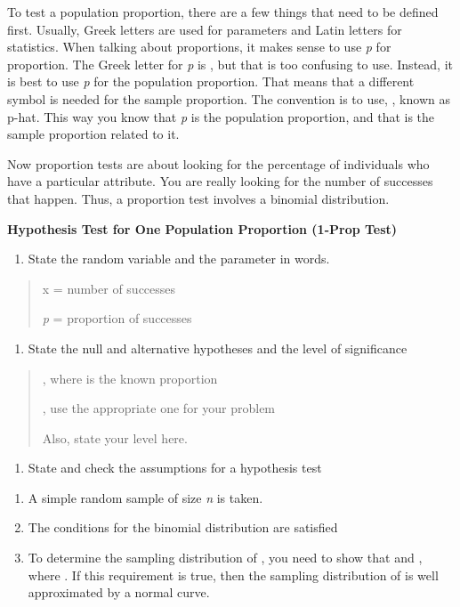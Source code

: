 \documentclass[]{book}
\providecommand{\tightlist}{%
  \setlength{\itemsep}{0pt}\setlength{\parskip}{0pt}}
\begin{document}
To test a population proportion, there are a few things that need to be defined first. Usually, Greek letters are used for parameters and Latin letters for statistics. When talking about proportions, it makes sense to use \emph{p} for proportion. The Greek letter for \emph{p} is , but that is too confusing to use. Instead, it is best to use \emph{p} for the population proportion. That means that a different symbol is needed for the sample proportion. The convention is to use, , known as p-hat. This way you know that \emph{p} is the population proportion, and that is the sample proportion related to it.

Now proportion tests are about looking for the percentage of individuals who have a particular attribute. You are really looking for the number of successes that happen. Thus, a proportion test involves a binomial distribution.

\textbf{Hypothesis Test for One Population Proportion (1-Prop Test)}

\begin{enumerate}
\def\labelenumi{\arabic{enumi}.}
\tightlist
\item
  State the random variable and the parameter in words.
\end{enumerate}

\begin{quote}
x = number of successes

\emph{p} = proportion of successes
\end{quote}

\begin{enumerate}
\def\labelenumi{\arabic{enumi}.}
\setcounter{enumi}{1}
\tightlist
\item
  State the null and alternative hypotheses and the level of
  significance
\end{enumerate}

\begin{quote}
, where is the known proportion

, use the appropriate one for your problem

Also, state your level here.
\end{quote}

\begin{enumerate}
\def\labelenumi{\arabic{enumi}.}
\setcounter{enumi}{2}
\tightlist
\item
  State and check the assumptions for a hypothesis test
\end{enumerate}

\begin{enumerate}
\def\labelenumi{\alph{enumi}.}
\item
  A simple random sample of size \emph{n} is taken.
\item
  The conditions for the binomial distribution are satisfied
\item
  To determine the sampling distribution of , you need to show that
  and , where . If this requirement is true, then the sampling
  distribution of is well approximated by a normal curve.
\end{enumerate}
\end{document}
